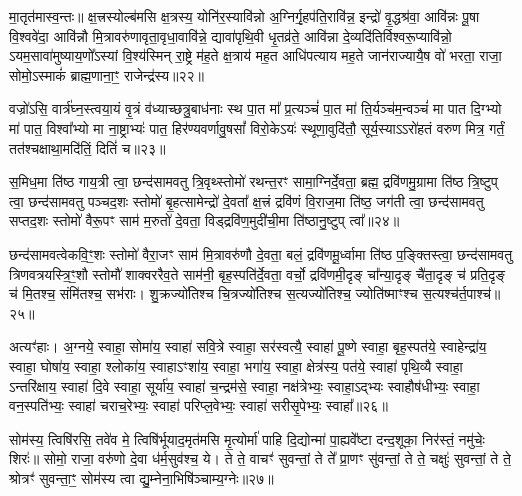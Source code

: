 मा॒तृत॑मास्व॒न्तः॥ क्ष॒त्त्रस्योल्ब॑मसि क्ष॒त्रस्य॒ योनि॑र॒स्यावि॑न्नो अ॒ग्निर्गृ॒हप॑ति॒रावि॑न्न॒ इन्द्रो॑ वृ॒द्धश्र॑वा॒ आवि॑न्नः पू॒षा वि॒श्ववे॑दा॒ आवि॑न्नौ मि॒त्रावरु॑णावृता॒वृधा॒वावि॑न्ने॒ द्यावा॑पृथि॒वी धृ॒तव्र॑ते॒ आवि॑न्ना दे॒व्यदि॑तिर्विश्वरू॒प्यावि॑न्नो॒ \-ऽयम॒सावा॑मुष्याय॒णो᳚\-ऽस्यां वि॒श्य॑स्मिन् रा॒ष्ट्रे म॑ह॒ते क्ष॒त्राय॑ मह॒त आधि॑पत्याय मह॒ते जान॑राज्यायै॒ष वो॑ भरता॒ राजा॒ सोमो॒\-ऽस्माकं॑ ब्राह्म॒णाना॒ꣳ॒ राजेन्द्र॑स्य॥२२॥

वज्रो॑\-ऽसि॒ वार्त्र॑घ्न॒स्त्वया॒यं वृ॒त्रं व॑ध्याच्छत्रु॒बाध॑नाः स्थ पा॒त मा᳚ प्र॒त्यञ्चं॑ पा॒त मा॑ ति॒र्यञ्च॑म॒न्वञ्चं॑ मा पात दि॒ग्भ्यो मा॑ पात॒ विश्वा᳚भ्यो मा ना॒ष्ट्राभ्यः॑ पात॒ हिर॑ण्यवर्णावु॒षसां᳚ विरो॒के\-ऽयः॑ स्थूणा॒वुदि॑तौ॒ सूर्य॒स्या\-ऽ\-ऽरो॑हतं वरुण मित्र॒ गर्तं॒ तत॑श्चक्षाथा॒मदि॑तिं॒ दितिं॑ च॥२३॥

{\anuvakamend[{शिशु॒रिन्द्र॒स्यैक॑चत्वारिꣳशच्च॥12॥}]}

स॒मिध॒मा ति॑ष्ठ गाय॒त्री त्वा॒ छन्द॑सामवतु त्रि॒वृथ्स्तोमो॑ रथन्त॒रꣳ सामा॒ग्निर्दे॒वता॒ ब्रह्म॒ द्रवि॑णमु॒ग्रामा ति॑ष्ठ त्रि॒ष्टुप् त्वा॒ छन्द॑सामवतु पञ्चद॒शः स्तोमो॑ बृ॒हत्सामेन्द्रो॑ दे॒वता᳚ क्ष॒त्त्रं द्रवि॑णं वि॒राज॒मा ति॑ष्ठ॒ जग॑ती त्वा॒ छन्द॑सामवतु सप्तद॒शः स्तोमो॑ वैरू॒पꣳ साम॑ म॒रुतो॑ दे॒वता॒ विड्द्रवि॑ण॒मुदी॑ची॒मा ति॑ष्ठानु॒ष्टुप् त्वा᳚॥२४॥

छन्द॑सामवत्वेकवि॒ꣳ॒शः स्तोमो॑ वैरा॒जꣳ साम॑ मि॒त्रावरु॑णौ दे॒वता॒ बलं॒ द्रवि॑णमू॒र्ध्वामा ति॑ष्ठ प॒ङ्क्तिस्त्वा॒ छन्द॑सामवतु त्रिणवत्रयस्त्रि॒ꣳ॒शौ स्तोमौ॑ शाक्वररैव॒ते साम॑नी॒ बृह॒स्पति॑र्दे॒वता॒ वर्चो॒ द्रवि॑णमी॒दृङ् चा᳚न्या॒दृङ् चै॑ता॒दृङ् च॑ प्रति॒दृङ् च॑ मि॒तश्च॒ संमि॑तश्च॒ सभ॑राः। शु॒क्रज्यो॑तिश्च चि॒त्रज्यो॑तिश्च स॒त्यज्यो॑तिश्च॒ ज्योति॑ष्माꣳश्च स॒त्यश्च॑र्त॒पाश्च॑॥२५॥

अत्यꣳ॑हाः। अ॒ग्नये॒ स्वाहा॒ सोमा॑य॒ स्वाहा॑ सवि॒त्रे स्वाहा॒ सर॑स्वत्यै॒ स्वाहा॑ पू॒ष्णे स्वाहा॒ बृह॒स्पत॑ये॒ स्वाहेन्द्रा॑य॒ स्वाहा॒ घोषा॑य॒ स्वाहा॒ श्लोका॑य॒ स्वाहा\-ऽꣳशा॑य॒ स्वाहा॒ भगा॑य॒ स्वाहा॒ क्षेत्र॑स्य॒ पत॑ये॒ स्वाहा॑ पृथि॒व्यै स्वाहा॒ \-ऽन्तरि॑क्षाय॒ स्वाहा॑ दि॒वे स्वाहा॒ सूर्या॑य॒ स्वाहा॑ च॒न्द्रम॑से॒ स्वाहा॒ नक्ष॑त्रेभ्यः॒ स्वाहा॒\-ऽद्भ्यः स्वाहौष॑धीभ्यः॒ स्वाहा॒ वन॒स्पति॑भ्यः॒ स्वाहा॑ चराच॒रेभ्यः॒ स्वाहा॑ परिप्ल॒वेभ्यः॒ स्वाहा॑ सरीसृ॒पेभ्यः॒ स्वाहा᳚॥२६॥

{\anuvakamend[{अ॒नु॒ष्टुप्त्व॑र्त॒पाश्च॑ सरीसृ॒पेभ्यः॒ स्वाहा᳚॥13॥}]}

सोम॑स्य॒ त्विषि॑रसि॒ तवे॑व मे॒ त्विषि॑र्भूयाद॒मृत॑मसि मृ॒त्योर्मा॑ पाहि दि॒द्योन्मा॑ पा॒ह्यवे᳚ष्टा दन्द॒शूका॒ निर॑स्तं॒ नमु॑चेः॒ शिरः॑॥ सोमो॒ राजा॒ वरु॑णो दे॒वा ध॑र्म॒सुव॑श्च॒ ये। ते ते॒ वाचꣳ॑ सुवन्तां॒ ते ते᳚ प्रा॒णꣳ सु॑वन्तां॒ ते ते॒ चक्षुः॑ सुवन्तां॒ ते ते॒ श्रोत्रꣳ॑ सुवन्ता॒ꣳ॒ सोम॑स्य त्वा द्यु॒म्नेना॒भिषि॑ञ्चाम्य॒ग्नेः॥२७॥

